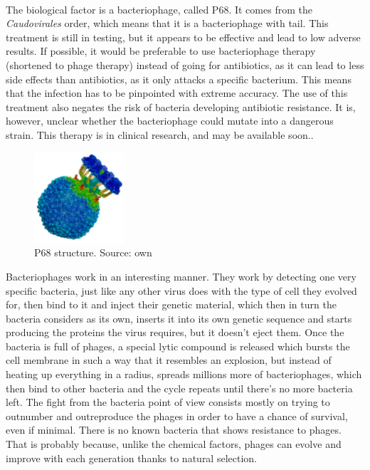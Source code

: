 \paragraph{}The biological factor is a bacteriophage, called P68. It comes from the \emph{Caudovirales} order, which means that it is a bacteriophage with tail.  This treatment is still in testing, but it appears to be effective and lead to low adverse results. If possible, it would be preferable to use bacteriophage therapy (shortened to phage therapy) instead of going for antibiotics, as it can lead to less side effects than antibiotics, as it only attacks a specific bacterium. This means that the infection has to be pinpointed with extreme accuracy. The use of this treatment also negates the risk of bacteria developing antibiotic resistance. It is, however, unclear whether the bacteriophage could mutate into a dangerous strain. This therapy is in clinical research, and may be available soon.\cite{zhouReviewNanosystemsEffective2018}.
\newpage{}\begin{figure}\begin{center}\includegraphics[width=0.30\textwidth]{assets/staph_side.png}\end{center}\caption{P68 structure. Source: own}\end{figure}Bacteriophages work in an interesting manner. They work by detecting one very specific bacteria, just like any other virus does with the type of cell they evolved for, then bind to it and inject their genetic material, which then in turn the bacteria considers as its own, inserts it into its own genetic sequence and starts producing the proteins the virus requires, but it doesn't eject them. Once the bacteria is full of phages, a special lytic compound is released which bursts the cell membrane in such a way that it resembles an explosion, but instead of heating up everything in a radius, spreads millions more of bacteriophages, which then bind to other bacteria and the cycle repeats until there's no more bacteria left. The fight from the bacteria point of view consists mostly on trying to outnumber and outreproduce the phages in order to have a chance of survival, even if minimal. There is no known bacteria that shows resistance to phages. That is probably because, unlike the chemical factors, phages can evolve and improve with each generation thanks to natural selection\cite{hrebikStructureGenomeEjection2019a}.
